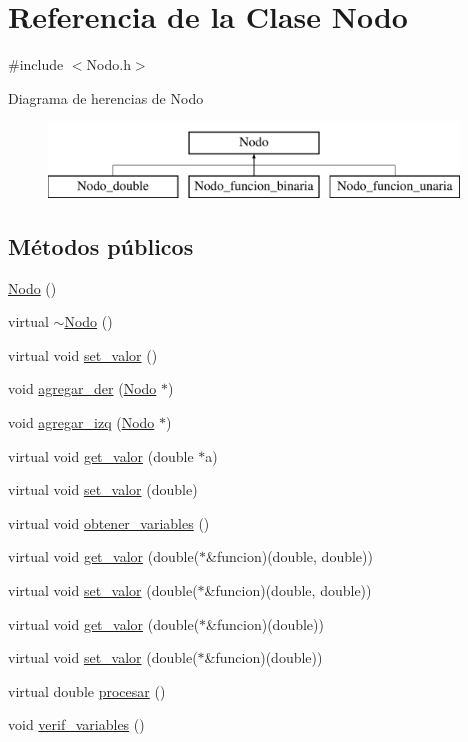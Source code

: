\hypertarget{class_nodo}{}\section{Referencia de la Clase Nodo}
\label{class_nodo}


{\ttfamily \#include $<$Nodo.\+h$>$}

Diagrama de herencias de Nodo\begin{figure}[H]
\begin{center}
\leavevmode
\includegraphics[height=2.000000cm]{class_nodo}
\end{center}
\end{figure}
\subsection*{Métodos públicos}
\begin{DoxyCompactItemize}
\item 
\hyperlink{class_nodo_ac30bd1bed827ef8784fd3cebd032e9a4}{Nodo} ()
\item 
virtual \hyperlink{class_nodo_a8a1dd01c95ff7bcb1182318498e834f9}{$\sim$\+Nodo} ()
\item 
virtual void \hyperlink{class_nodo_aaec6b546849827a198f8f9cfb785ddae}{set\+\_\+valor} ()
\item 
void \hyperlink{class_nodo_a1fdafb332912a0627e38f49e48c6c7a8}{agregar\+\_\+der} (\hyperlink{class_nodo}{Nodo} $\ast$)
\item 
void \hyperlink{class_nodo_ac40bf9aeb6268154ae64ba30808aead0}{agregar\+\_\+izq} (\hyperlink{class_nodo}{Nodo} $\ast$)
\item 
virtual void \hyperlink{class_nodo_af1d46c59678aad7bd2d772b0cea8d0b6}{get\+\_\+valor} (double $\ast$a)
\item 
virtual void \hyperlink{class_nodo_a391f7fb5f14e8c1ac8c0a54c158cf0db}{set\+\_\+valor} (double)
\item 
virtual void \hyperlink{class_nodo_a6b4c640c1cb52203a259321b4bb5ad17}{obtener\+\_\+variables} ()
\item 
virtual void \hyperlink{class_nodo_a0c4cf8fa55c25f9a4a9a68a0b07d9108}{get\+\_\+valor} (double($\ast$\&funcion)(double, double))
\item 
virtual void \hyperlink{class_nodo_af7b0ec4fc3a0a3ef46dc31eca99fdbd6}{set\+\_\+valor} (double($\ast$\&funcion)(double, double))
\item 
virtual void \hyperlink{class_nodo_a4bd234bb2194e7708e71f25d125b9934}{get\+\_\+valor} (double($\ast$\&funcion)(double))
\item 
virtual void \hyperlink{class_nodo_a134a6a0ca143bfa73bc6e8184bb9f69d}{set\+\_\+valor} (double($\ast$\&funcion)(double))
\item 
virtual double \hyperlink{class_nodo_a3f06904e422717bbc621acc054590755}{procesar} ()
\item 
void \hyperlink{class_nodo_aca274320e1051fe43ff5543140be2721}{verif\+\_\+variables} ()
\end{DoxyCompactItemize}
